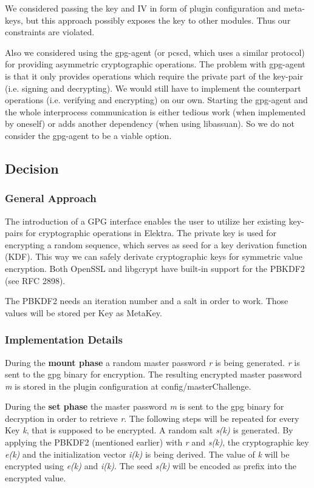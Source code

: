 We considered passing the key and I\+V in form of plugin configuration and meta-\/keys, but this approach possibly exposes the key to other modules. Thus our constraints are violated.

Also we considered using the gpg-\/agent (or pcscd, which uses a similar protocol) for providing asymmetric cryptographic operations. The problem with gpg-\/agent is that it only provides operations which require the private part of the key-\/pair (i.\+e. signing and decrypting). We would still have to implement the counterpart operations (i.\+e. verifying and encrypting) on our own. Starting the gpg-\/agent and the whole interprocess communication is either tedious work (when implemented by oneself) or adds another dependency (when using libassuan). So we do not consider the gpg-\/agent to be a viable option.

\subsection*{Decision}

\subsubsection*{General Approach}

The introduction of a G\+P\+G interface enables the user to utilize her existing key-\/pairs for cryptographic operations in Elektra. The private key is used for encrypting a random sequence, which serves as seed for a key derivation function (K\+D\+F). This way we can safely derivate cryptographic keys for symmetric value encryption. Both Open\+S\+S\+L and libgcrypt have built-\/in support for the P\+B\+K\+D\+F2 (see R\+F\+C 2898).

The P\+B\+K\+D\+F2 needs an iteration number and a salt in order to work. Those values will be stored per Key as Meta\+Key.

\subsubsection*{Implementation Details}

During the {\bfseries mount phase} a random master password {\itshape r} is being generated. {\itshape r} is sent to the gpg binary for encryption. The resulting encrypted master password {\itshape m} is stored in the plugin configuration at {\ttfamily config/master\+Challenge}.

During the {\bfseries set phase} the master password {\itshape m} is sent to the gpg binary for decryption in order to retrieve {\itshape r}. The following steps will be repeated for every Key {\itshape k}, that is supposed to be encrypted. A random salt {\itshape s(k)} is generated. By applying the P\+B\+K\+D\+F2 (mentioned earlier) with {\itshape r} and {\itshape s(k)}, the cryptographic key {\itshape e(k)} and the initialization vector {\itshape i(k)} is being derived. The value of {\itshape k} will be encrypted using {\itshape e(k)} and {\itshape i(k)}. The seed {\itshape s(k)} will be encoded as prefix into the encrypted value.

